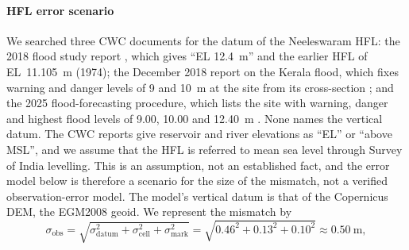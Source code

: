 \documentclass[preprint,12pt,authoryear]{elsarticle}
\begin{document}
\paragraph{HFL error scenario} We searched three CWC documents for the datum of the Neeleswaram HFL: the 2018 flood study report \citep{cwc2018}, which gives ``EL 12.4~m'' and the earlier HFL of EL~11.105~m (1974); the December 2018 report on the Kerala flood, which fixes warning and danger levels of 9 and 10~m at the site from its cross-section \citep{cwc2018b}; and the 2025 flood-forecasting procedure, which lists the site with warning, danger and highest flood levels of 9.00, 10.00 and 12.40~m \citep{cwc2025}. None names the vertical datum. The CWC reports give reservoir and river elevations as ``EL'' or ``above MSL'', and we assume that the HFL is referred to mean sea level through Survey of India levelling. This is an assumption, not an established fact, and the error model below is therefore a scenario for the size of the mismatch, not a verified observation-error model. The model's vertical datum is that of the Copernicus DEM, the EGM2008 geoid. We represent the mismatch by
\begin{equation}
\sigma_\mathrm{obs} = \sqrt{\sigma_\mathrm{datum}^2 + \sigma_\mathrm{cell}^2 + \sigma_\mathrm{mark}^2} = \sqrt{0.46^2 + 0.13^2 + 0.10^2} \approx 0.50~\mathrm{m},
\label{eq:hflerror}
\end{equation}
\end{document}
